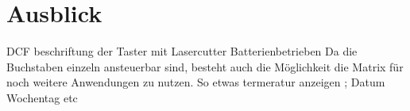 \documentclass[12pt,journal,compsoc]{IEEEtran}
\begin{document}
\section{Ausblick}
DCF
beschriftung der Taster mit Lasercutter
Batterienbetrieben
Da die Buchstaben  einzeln ansteuerbar sind, besteht auch die Möglichkeit die Matrix für noch weitere Anwendungen zu nutzen. So  etwas termeratur anzeigen ; Datum Wochentag etc

\nocite{*}
%
%





\end{document}
